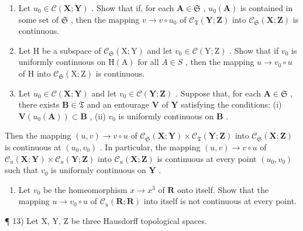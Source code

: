 \begin{enumerate}
\def\labelenumi{\alph{enumi})}
\item
  Let \(u_0 \in \mathcal{C}(\mathbf{X}; \mathbf{Y})\) . Show that if, for each \(\mathbf{A} \in \mathfrak{S}\) , \(u_0(\mathbf{A})\) is contained in some set of \(\mathfrak{S}\) , then the mapping \(v \to v \circ u_0\) of \(\mathcal{C}_{\mathfrak{T}}(\mathbf{Y}; \mathbf{Z})\) into \(\mathcal{C}_{\mathfrak{S}}(\mathbf{X}; \mathbf{Z})\) is continuous.
\item
  Let H be a subspace of \(\mathcal{C}_{\mathfrak{S}}(\mathrm{X};\mathrm{Y})\) and let \(v_{0}\in\mathcal{C}(\mathrm{Y};\mathrm{Z})\) . Show that if \(v_{0}\) is uniformly continuous on \(\mathrm{H}(\mathrm{A})\) for all \(A\in S\) , then the mapping \(u\to v_{0}\circ u\) of H into \(\mathcal{C}_{\mathfrak{S}}(\mathrm{X};\mathrm{Z})\) is continuous.
\item
  Let \(u_0 \in \mathcal{C}(\mathbf{X}; \mathbf{Y})\) and let \(v_0 \in \mathcal{C}(\mathbf{Y}; \mathbf{Z})\) . Suppose that, for each \(\mathbf{A} \in \mathfrak{S}\) , there exists \(\mathbf{B} \in \mathfrak{T}\) and an entourage \(\mathbf{V}\) of \(\mathbf{Y}\) satisfying the conditions: (i) \(\mathbf{V}(u_0(\mathbf{A})) \subset \mathbf{B}\) , (ii) \(v_0\) is uniformly continuous on \(\mathbf{B}\) .
\end{enumerate}

Then the mapping \((u, v) \to v \circ u\) of \(\mathcal{C}_{\mathfrak{S}}(\mathbf{X}; \mathbf{Y}) \times \mathcal{C}_{\mathfrak{T}}(\mathbf{Y}; \mathbf{Z})\) into \(\mathcal{C}_{\mathfrak{S}}(\mathbf{X}; \mathbf{Z})\) is continuous at \((u_0, v_0)\) . In particular, the mapping \((u, v) \to v \circ u\) of \(\mathcal{C}_u(\mathbf{X}; \mathbf{Y}) \times \mathcal{C}_u(\mathbf{Y}; \mathbf{Z})\) into \(\mathcal{C}_u(\mathbf{X}; \mathbf{Z})\) is continuous at every point \((u_0, v_0)\) such that \(v_0\) is uniformly continuous on \(\mathbf{Y}\) .

\begin{enumerate}
\def\labelenumi{\alph{enumi})}
\setcounter{enumi}{3}
\tightlist
\item
  Let \(v_0\) be the homeomorphism \(x \to x^3\) of \(\mathbf{R}\) onto itself. Show that the mapping \(u \to v_0 \circ u\) of \(\mathcal{C}_u(\mathbf{R}; \mathbf{R})\) into itself is not continuous at every point.
\end{enumerate}

¶ 13) Let X, Y, Z be three Hausdorff topological spaces.

